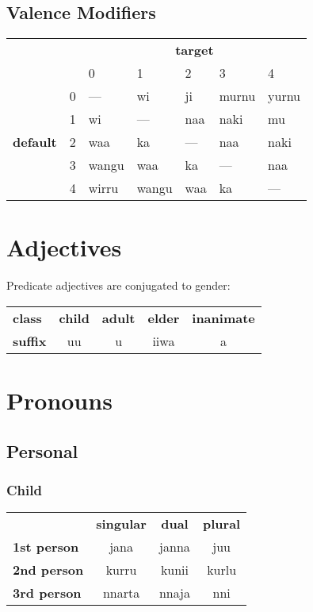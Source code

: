 \documentclass{article}
\begin{document}
\begin{multicols*}{3}
\subsection{Valence Modifiers}
\begin{tabular}{lllllll}
                                  &   & \multicolumn{5}{c}{\textbf{target}} \\
                                  &   & 0     & 1     & 2   & 3     & 4     \\
\multirow{5}{*}{\textbf{default}} & 0 & ---   & wi    & ji  & murnu & yurnu \\
                                  & 1 & wi    & ---   & naa & naki  & mu    \\
                                  & 2 & waa   & ka    & --- & naa   & naki  \\
                                  & 3 & wangu & waa   & ka  & ---   & naa   \\
                                  & 4 & wirru & wangu & waa & ka    & ---
\end{tabular}


\section{Adjectives}

Predicate adjectives are conjugated to gender:

\begin{tabular}{lcccc}
\textbf{class} & \textbf{child} & \textbf{adult} & \textbf{elder} & \textbf{inanimate}\\
\textbf{suffix} & uu & u & iiwa & a\\
\end{tabular}

\section{Pronouns}

\subsection{Personal}

\subsubsection{Child}
\begin{tabular}{lccc}
 & \textbf{singular} & \textbf{dual} & \textbf{plural}\\
 \textbf{1st person} & jana & janna & juu\\
 \textbf{2nd person} & kurru & kunii & kurlu\\
 \textbf{3rd person} & nnarta & nnaja & nni\\
\end{tabular}


\end{multicols*}
\end{document}
